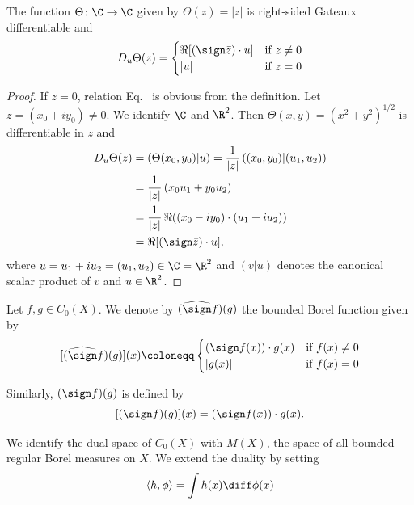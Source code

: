 \begin{lemma}\label{lem:b2-2.4}
The function $\Theta \colon \C \to \C$ given by $\Theta(z) = |z|$ is right-sided Gateaux differentiable and
\begin{equation}\label{eq:b2-2.6}
D_{u}\Theta(z) = \begin{cases}
    \Re[(\sign \bar{z}) \cdot u] & \text{if } z \neq 0 \\
    |u| & \text{if } z = 0
\end{cases}
\end{equation}
\end{lemma}
\begin{proof}
If\/ $z = 0$, relation Eq.~ is obvious from the definition.
Let $z = (x_{0} + iy_{0}) \neq 0$.
We identify $\C$ and $\R^2$.
Then $\Theta(x,y) = (x^2 + y^2)^{1/2}$ is differentiable in $z$ and
\begin{align*}
D_{u}\Theta(z) &= (\Theta(x_{0},y_{0})|u) = \frac{1}{|z|}\, ((x_{0},y_{0})|(u_{1},u_{2}))  \\
               &= \frac{1}{|z|}\, (x_{0}u_{1} + y_{0}u_{2}) \\
               &= \frac{1}{|z|}\, \Re((x_{0}-iy_{0})\cdot(u_{1}+iu_{2})) \\
               &= \Re[(\sign \bar{z})\cdot u],
\end{align*}
where $u = u_{1} + iu_{2} = (u_{1},u_{2}) \in \C = \R^2$ and $(v|u)$ denotes the canonical scalar product of\/ 
$v$ and $u \in \R^2$.
\end{proof}
Let $f, g \in C_{0}(X)$.
We denote by $(\widehat{\sign} f)(g)$ the bounded Borel function given by
\begin{equation}\label{eq:b2-2.7}
[(\widehat{\sign} f)(g)](x) \coloneqq \begin{cases}
    (\sign f(x))\cdot g(x) & \text{if } f(x) \neq 0 \\
    |g(x)| & \text{if } f(x) = 0
\end{cases}
\end{equation}

Similarly, $(\sign f)(g)$ is defined by
\begin{equation}\label{eq:b2-2.8}
[(\sign f)(g)](x) = ({\sign} f(x))\cdot g(x).
\end{equation}

We identify the dual space of\/ $C_{0}(X)$ with $M(X)$, the space of all bounded regular Borel measures on $X$.
We extend the duality by setting
\begin{equation*}
\langle h,\phi \rangle = \int h(x)   \diff\phi(x)
\end{equation*}

